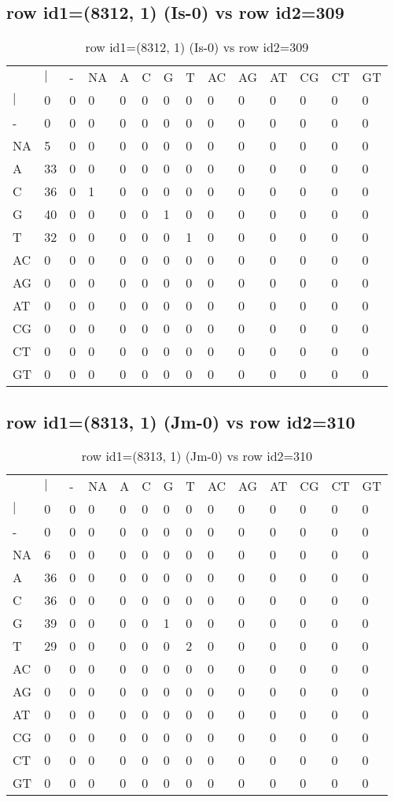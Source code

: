 \subsection{row id1=(8312, 1) (Is-0) vs row id2=309}
\begin{center}
\begin{longtable}{|l|l|l|l|l|l|l|l|l|l|l|l|l|l|}
\caption{row id1=(8312, 1) (Is-0) vs row id2=309} \label{table_dm298}\\
\hline
\\
\hline
&$|$&-&NA&A&C&G&T&AC&AG&AT&CG&CT&GT\\
$|$&0&0&0&0&0&0&0&0&0&0&0&0&0\\
-&0&0&0&0&0&0&0&0&0&0&0&0&0\\
NA&5&0&0&0&0&0&0&0&0&0&0&0&0\\
A&33&0&0&0&0&0&0&0&0&0&0&0&0\\
C&36&0&1&0&0&0&0&0&0&0&0&0&0\\
G&40&0&0&0&0&1&0&0&0&0&0&0&0\\
T&32&0&0&0&0&0&1&0&0&0&0&0&0\\
AC&0&0&0&0&0&0&0&0&0&0&0&0&0\\
AG&0&0&0&0&0&0&0&0&0&0&0&0&0\\
AT&0&0&0&0&0&0&0&0&0&0&0&0&0\\
CG&0&0&0&0&0&0&0&0&0&0&0&0&0\\
CT&0&0&0&0&0&0&0&0&0&0&0&0&0\\
GT&0&0&0&0&0&0&0&0&0&0&0&0&0\\
\hline
\end{longtable}
\end{center}

\subsection{row id1=(8313, 1) (Jm-0) vs row id2=310}
\begin{center}
\begin{longtable}{|l|l|l|l|l|l|l|l|l|l|l|l|l|l|}
\caption{row id1=(8313, 1) (Jm-0) vs row id2=310} \label{table_dm300}\\
\hline
\\
\hline
&$|$&-&NA&A&C&G&T&AC&AG&AT&CG&CT&GT\\
$|$&0&0&0&0&0&0&0&0&0&0&0&0&0\\
-&0&0&0&0&0&0&0&0&0&0&0&0&0\\
NA&6&0&0&0&0&0&0&0&0&0&0&0&0\\
A&36&0&0&0&0&0&0&0&0&0&0&0&0\\
C&36&0&0&0&0&0&0&0&0&0&0&0&0\\
G&39&0&0&0&0&1&0&0&0&0&0&0&0\\
T&29&0&0&0&0&0&2&0&0&0&0&0&0\\
AC&0&0&0&0&0&0&0&0&0&0&0&0&0\\
AG&0&0&0&0&0&0&0&0&0&0&0&0&0\\
AT&0&0&0&0&0&0&0&0&0&0&0&0&0\\
CG&0&0&0&0&0&0&0&0&0&0&0&0&0\\
CT&0&0&0&0&0&0&0&0&0&0&0&0&0\\
GT&0&0&0&0&0&0&0&0&0&0&0&0&0\\
\hline
\end{longtable}
\end{center}

